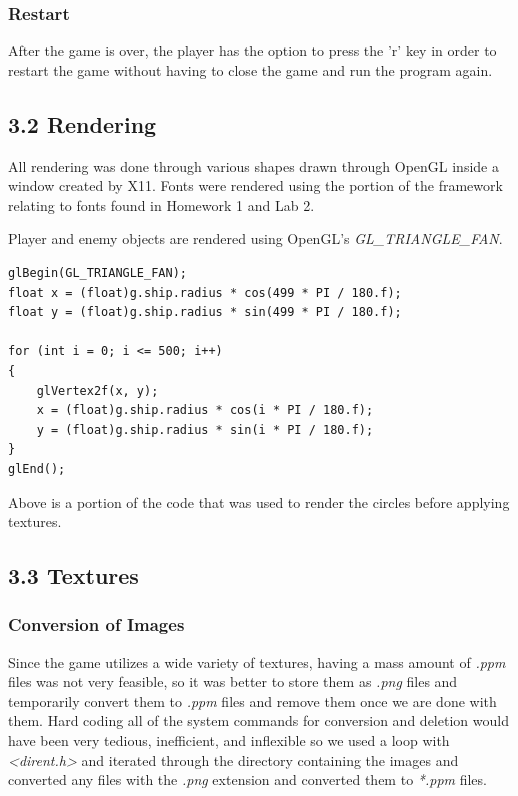 \documentclass[12pt]{report}
\begin{document}
\subsubsection*{Restart}
After the game is over, the player has the option to press the 'r' key in order to restart the game without having to close the game and run the program again.

\newpage
\subsection*{3.2 Rendering}
All rendering was done through various shapes drawn through OpenGL inside a window created by X11. Fonts were rendered using the portion of the framework relating to fonts found in Homework 1 and Lab 2. \bigskip

Player and enemy objects are rendered using OpenGL's \textit{GL\_TRIANGLE\_FAN}. \bigskip

\begin{lstlisting}
glBegin(GL_TRIANGLE_FAN);
float x = (float)g.ship.radius * cos(499 * PI / 180.f);
float y = (float)g.ship.radius * sin(499 * PI / 180.f);

for (int i = 0; i <= 500; i++)
{
	glVertex2f(x, y);
	x = (float)g.ship.radius * cos(i * PI / 180.f);
	y = (float)g.ship.radius * sin(i * PI / 180.f);
}
glEnd();
\end{lstlisting}
\noindent Above is a portion of the code that was used to render the circles before applying textures.

\newpage
\subsection*{3.3 Textures}
\subsubsection*{Conversion of Images}

Since the game utilizes a wide variety of textures, having a mass amount of \textit{.ppm} files was not very feasible, so it was better to store them as \textit{.png} files and temporarily convert them to \textit{.ppm} files and remove them once we are done with them. Hard coding all of the system commands for conversion and deletion would have been very tedious, inefficient, and inflexible so we used a loop with \textit{<dirent.h>} and iterated through the directory containing the images and converted any files with the \textit{.png} extension and converted them to \textit{*.ppm} files. \bigskip
\end{document}
